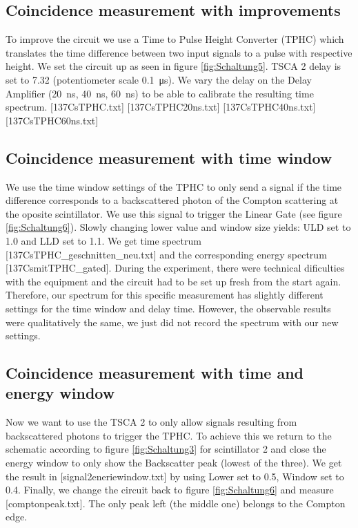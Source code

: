 \subsection{Coincidence measurement with improvements}
%
To improve the circuit we use a Time to Pulse Height Converter (TPHC) which translates the time difference between two input signals to a pulse with respective height.
We set the circuit up as seen in figure \ref{fig:Schaltung5}.
TSCA 2 delay is set to 7.32 (potentiometer scale \SI{0.1}{\micro\second}).
We vary the delay on the Delay Amplifier (\SI{20}{\nano\second}, \SI{40}{\nano\second}, \SI{60}{\nano\second}) to be able to calibrate the resulting time spectrum.
[137CsTPHC.txt]
[137CsTPHC20ns.txt]
[137CsTPHC40ns.txt]
[137CsTPHC60ns.txt]
%
\subsection{Coincidence measurement with time window}
%
We use the time window settings of the TPHC to only send a signal if the time difference corresponds to a backscattered photon of the Compton scattering at the oposite scintillator.
We use this signal to trigger the Linear Gate (see figure \ref{fig:Schaltung6}).
Slowly changing lower value and window size yields: ULD set to 1.0 and LLD set to 1.1.
We get time spectrum [137CsTPHC\_geschnitten\_neu.txt] and the corresponding energy spectrum [137CsmitTPHC\_gated].
During the experiment, there were technical dificulties with the equipment and the circuit had to be set up fresh from the start again.
Therefore, our spectrum for this specific measurement has slightly different settings for the time window and delay time.
However, the observable results were qualitatively the same, we just did not record the spectrum with our new settings.
%
\subsection{Coincidence measurement with time and energy window}
%
Now we want to use the TSCA 2 to only allow signals resulting from backscattered photons to trigger the TPHC.
To achieve this we return to the schematic according to figure \ref{fig:Schaltung3} for scintillator 2 and close the energy window to only show the Backscatter peak (lowest of the three).
We get the result in [signal2eneriewindow.txt] by using Lower set to 0.5, Window set to 0.4.
Finally, we change the circuit back to figure \ref{fig:Schaltung6} and measure [comptonpeak.txt].
The only peak left (the middle one) belongs to the Compton edge.
%
